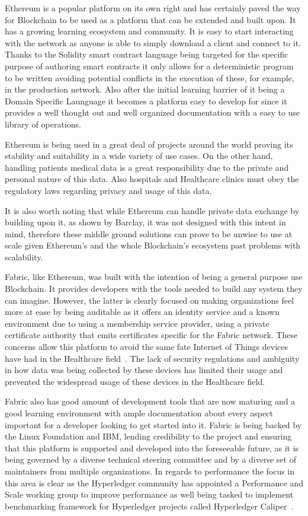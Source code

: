 Ethereum is a popular platform on its own right and has certainly paved the way
for Blockchain to be used as a platform that can be extended and built upon. It
has a growing learning ecosystem and community. It is easy to start interacting
with the network as anyone is able to simply download a client and connect to
it.  Thanks to the Solidity smart contract language being targeted for the
specific purpose of authoring smart contracts it only allows for a
deterministic program to be written avoiding potential conflicts in the
execution of these, for example, in the production network. Also after the
initial learning barrier of it being a Domain Specific Launguage it becomes a
platform easy to develop for since it provides a well thought out and well
organized documentation with a easy to use library of operations.

Ethereum is being used in a great deal of projects around the world proving its
stability and suitability in a wide variety of use cases. On the other hand,
handling patients medical data is a great responsibility due to the private and
personal nature of this data. Also hospitals and Healthcare clinics must obey
the regulatory laws regarding privacy and usage of this data.

It is also worth noting that while Ethereum can handle private data exchange by
building upon it, as shown by Barclay, it was not designed with this intent in
mind, therefore these middle ground solutions can prove to be unwise to use at
scale given Ethereum's and the whole Blockchain's ecosystem past problems with
scalability.  

Fabric, like Ethereum, was built with the intention of being a general purpose
use Blockchain. It provides developers with the tools needed to build any
system they can imagine. However, the latter is clearly focused on making
organizations feel more at ease by being auditable as it offers an identity
service and a known environment due to using a membership service provider,
using a private certificate authority that emits certificates specific for the
Fabric network. These concerns allow this platform to avoid the same fate
Internet of Things devices have had in the Healthcare field~\cite{Tana2017}.
The lack of security regulations and ambiguity in how data was being collected
by these devices has limited their usage and prevented the widespread usage of
these devices in the Healthcare field.

Fabric also has good amount of development tools that are now maturing and a
good learning environment with ample documentation about every aspect important
for a developer looking to get started into it. Fabric is being backed by the
Linux Foundation and IBM, lending credibility to the project and ensuring that
this platform is supported and developed into the foreseeable future, as it is
being governed by a diverse technical steering committee and by a diverse set
of maintainers from multiple organizations. In regards to performance the focus
in this area is clear as the Hyperledger community has appointed a Performance
and Scale working group to improve performance as well being tasked to
implement benchmarking framework for Hyperledger projects called Hyperledger
Caliper~\cite{performanceScale2017}.

